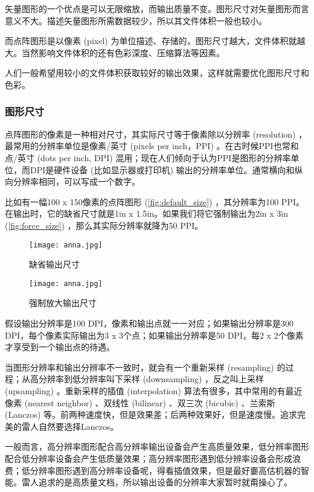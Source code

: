 矢量图形的一个优点是可以无限缩放，而输出质量不变。图形尺寸对矢量图形而言意义不大。描述矢量图形所需数据较少，所以其文件体积一般也较小。

而点阵图形是以像素 (pixel) 为单位描述、存储的，图形尺寸越大，文件体积就越大。当然影响文件体积的还有色彩深度、压缩算法等因素。

人们一般希望用较小的文件体积获取较好的输出效果，这样就需要优化图形尺寸和色彩。

\subsubsection{图形尺寸}

点阵图形的像素是一种相对尺寸，其实际尺寸等于像素除以分辨率 (resolution) ，最常用的分辨率单位是像素/英寸 (pixels per inch，PPI) 。在古时候PPI也常和点/英寸 (dots per inch, DPI) 混用；现在人们倾向于认为PPI是图形的分辨率单位，而DPI是硬件设备 (比如显示器或打印机) 输出的分辨率单位。通常横向和纵向分辨率相同，可以写成一个数字。

比如有一幅100 x 150像素的点阵图形 (\autoref{fig:default_size}) ，其分辨率为100 PPI。在输出时，它的缺省尺寸就是1in x 1.5in。如果我们将它强制输出为2in x 3in (\autoref{fig:force_size}) ，那么其实际分辨率就降为50 PPI。

\begin{figure}[htbp]
\centering
\begin{minipage}[b]{1.4in}
\centering
\texttt{[image: anna.jpg]}
\caption{缺省输出尺寸}
\label{fig:default_size}
\end{minipage}
\hspace{10pt}
\begin{minipage}[b]{2in}
\centering
\texttt{[image: anna.jpg]}
\caption{强制放大输出尺寸}
\label{fig:force_size}
\end{minipage}
\end{figure}

假设输出分辨率是100 DPI，像素和输出点就一一对应；如果输出分辨率是300 DPI，每个像素实际输出为3 x 3个点；如果输出分辨率是50 DPI，每2 x 2个像素才享受到一个输出点的待遇。

当图形分辨率和输出分辨率不一致时，就会有一个重新采样 (resampling) 的过程；从高分辨率到低分辨率叫下采样 (downsampling) ，反之叫上采样 (upsampling) 。重新采样的插值 (interpolation) 算法有很多，其中常用的有最近像素 (nearest neighbor) 、双线性 (bilinear) 、双三次 (bicubic) 、兰索斯 (Lanczos) 等。前两种速度快，但是效果差；后两种效果好，但是速度慢。追求完美的雷人自然要选择Lanczos。

一般而言，高分辨率图形配合高分辨率输出设备会产生高质量效果，低分辨率图形配合低分辨率设备会产生低质量效果；高分辨率图形遇到低分辨率设备会形成浪费；低分辨率图形遇到高分辨率设备呢，得看插值效果，但是最好嫑高估机器的智能。雷人追求的是高质量文档，所以输出设备的分辨率大家暂时就甭操心了。


